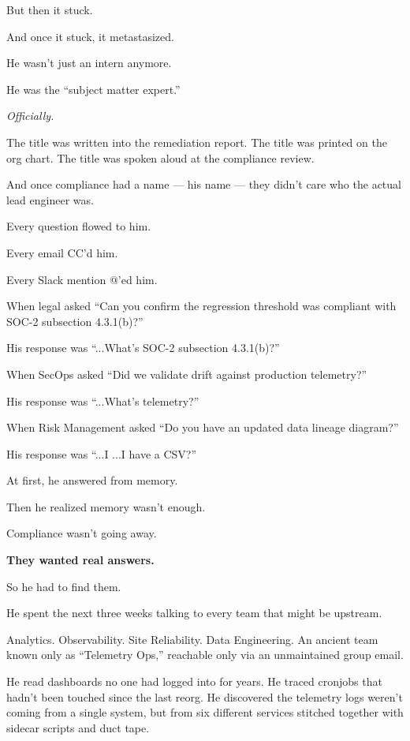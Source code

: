     \medskip
    
    But then it stuck.
    
    And once it stuck, it metastasized.
    
    He wasn’t just an intern anymore.
    
    He was the “subject matter expert.”
    
    \textit{Officially.}
    
    The title was written into the remediation report.  
    The title was printed on the org chart.  
    The title was spoken aloud at the compliance review.
    
    And once compliance had a name --- his name --- they didn’t care who the actual lead engineer was.
    
    Every question flowed to him.
    
    Every email CC’d him.
    
    Every Slack mention @’ed him.
    
    When legal asked “Can you confirm the regression threshold was compliant with SOC-2 subsection 4.3.1(b)?”  

    His response was “...What’s SOC-2 subsection 4.3.1(b)?”
    
    When SecOps asked “Did we validate drift against production telemetry?”  
    
    His response was “...What’s telemetry?”
    
    When Risk Management asked “Do you have an updated data lineage diagram?”  

    His response was “...I ...I have a CSV?”
    
    At first, he answered from memory.
    
    Then he realized memory wasn’t enough.
    
    Compliance wasn’t going away.
    
    \textbf{They wanted real answers.}
    
    So he had to find them.
    
    He spent the next three weeks talking to every team that might be upstream.
    
    Analytics.  
    Observability.  
    Site Reliability.  
    Data Engineering.  
    An ancient team known only as “Telemetry Ops,” reachable only via an unmaintained group email.
    
    He read dashboards no one had logged into for years.  
    He traced cronjobs that hadn’t been touched since the last reorg.  
    He discovered the telemetry logs weren’t coming from a single system, but from six different services stitched together with sidecar scripts and duct tape.
    
